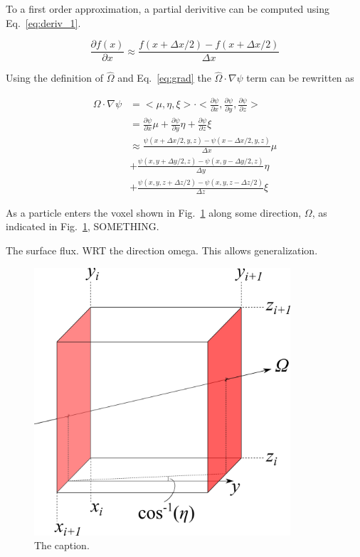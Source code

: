 To a first order approximation, a partial derivitive can be computed using Eq.~\ref{eq:deriv_1}.

\begin{equation} \label{eq:deriv_1}
\frac{\partial f(x)}{\partial x} \approx \frac{f(x+\Delta x/2) - f(x + \Delta x/2)}{\Delta x}
\end{equation}

Using the definition of $\hat{\Omega}$ and Eq.~\ref{eq:grad} the $\hat{\Omega} \cdot \nabla \psi$ term can be rewritten as

\begin{equation} \label{eq:spatial_1}
\begin{split}
\Omega \cdot \nabla \psi 
& = <\mu, \eta, \xi> \cdot <\frac{\partial \psi}{\partial x}, \frac{\partial \psi}{\partial y}, \frac{\partial \psi}{\partial z}> \\
& =
\frac{\partial \psi}{\partial x}\mu + \frac{\partial \psi}{\partial y}\eta + \frac{\partial \psi}{\partial z}\xi \\
& \approx 
\frac{\psi(x + \Delta x/2, y, z) - \psi(x - \Delta x/2, y, z)}{\Delta x} \mu \\
&+ 
\frac{\psi(x, y + \Delta y/2, z) - \psi(x, y - \Delta y/2, z)}{\Delta y} \eta \\
&+ 
\frac{\psi(x, y, z + \Delta z/2) - \psi(x, y, z - \Delta z/2)}{\Delta z} \xi
\end{split}
\end{equation}

As a particle enters the voxel shown in Fig.~\ref{fig:gradient} along some direction, $\Omega$, as indicated in Fig.~\ref{fig:gradient}, SOMETHING. 

The surface flux. WRT the direction omega. This allows generalization.

\begin{figure}[tb]
  \begin{center}
   \includegraphics[width=3.75in]{figs/gradient}
  \end{center}
  \caption{The caption.}
\label{fig:gradient}
\end{figure}%

